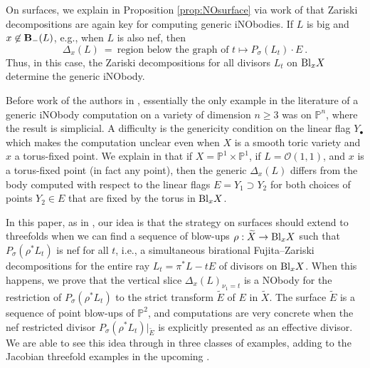 \documentclass[12pt]{amsart}
\theoremstyle{definition}
\newcommand{\bb}{\ensuremath{\mathfrak{b}}}
\renewcommand{\geq}{\geqslant}
\newcommand{\nob}[2]{\ensuremath{\Delta_{#1}(#2)}}
\newcommand{\inob}[2]{\ensuremath{{\Delta}_{#1}(#2)}}
\newcommand{\?}{ \circled{{\large\bf ?}}}
\let\cal\mathcal
\let\bb\mathbb
\begin{document}
On surfaces, we explain in Proposition \ref{prop:NOsurface} via work of \cite{LM09} that Zariski decompositions are again key for computing generic iNObodies. If $L$ is big and $x\not\in{\bf B}_-(L)$, e.g., when $L$ is also nef, then 
\[\inob{x}{L}\ =\ \text{region below the graph of }t\mapsto P_{\sigma}(L_t)\cdot E\ .\]
Thus, in this case, the Zariski decompositions for all divisors $L_t$ on ${\rm Bl}_xX$ determine the generic iNObody.

Before work of the authors in \cite{FLgeneralities,FLproductcurves,FLjac}, essentially the only example in the literature of a generic iNObody computation on a variety of dimension $n\geq 3$ was on $\bb P^n$, where the result is simplicial. A difficulty is the genericity condition on the linear flag $Y_{\bullet}$ which makes the computation unclear even when $X$ is a smooth toric variety and $x$ a torus-fixed point. We explain in \cite{FLgeneralities} that if $X=\bb P^1\times\bb P^1$, if $L=\cal O(1,1)$, and $x$ is a torus-fixed point (in fact any point), then the generic $\inob{x}{L}$ differs from the body computed with respect to the linear flags $E=Y_1\supset Y_2$ for both choices of points $Y_2\in E$ that are fixed by the torus in ${\rm Bl}_xX$.

In this paper, as in \cite{FLjac}, our idea is that the strategy on surfaces should extend to threefolds when we can find a sequence of blow-ups $\rho:\widetilde X\to {\rm Bl}_xX$ such that $P_{\sigma}(\rho^*L_t)$ is nef for all $t$, i.e., a simultaneous birational Fujita--Zariski decompositions for the entire ray $L_t=\pi^*L-tE$ of divisors on ${\rm Bl}_xX$. When this happens, we prove that the vertical slice $\nob{x}{L}_{\nu_1=t}$ is a NObody for the restriction of $P_{\sigma}(\rho^*L_t)$ to the strict transform $\widetilde E$ of $E$ in $\widetilde X$.  The surface $\widetilde E$ is a sequence of point blow-ups of $\bb P^2$, and computations are very concrete when the nef restricted divisor $P_{\sigma}(\rho^*L_t)|_{\widetilde E}$ is explicitly presented as an effective divisor. We are able to see this idea through in three classes of examples, adding to the Jacobian threefold examples in the upcoming \cite{FLjac}. 
\end{document}
